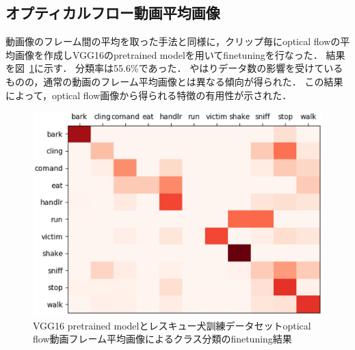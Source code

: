 \subsection{オプティカルフロー動画平均画像}
動画像のフレーム間の平均を取った手法と同様に，クリップ毎にoptical flowの平均画像を作成しVGG16のpretrained modelを用いてfinetuningを行なった．
結果を図~\ref{sub_optresque_res}に示す．
分類率は55.6\%であった．
やはりデータ数の影響を受けているものの，通常の動画のフレーム平均画像とは異なる傾向が得られた．
この結果によって，optical flow画像から得られる特徴の有用性が示された．
\begin{figure}[H]
  \begin{center}
    \includegraphics[scale=0.7]{./Figures/resque_optmean_result.eps}
    \caption{VGG16 pretrained modelとレスキュー犬訓練データセットoptical flow動画フレーム平均画像によるクラス分類のfinetuning結果}
    \label{sub_optresque_res}
  \end{center}
\end{figure}
